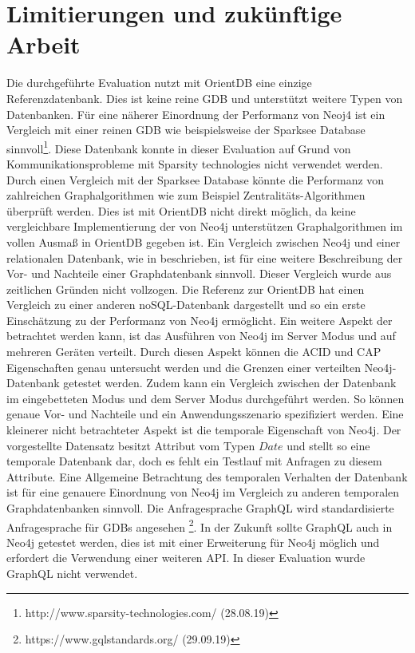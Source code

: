 \section{Limitierungen und zukünftige Arbeit}
Die durchgeführte Evaluation nutzt mit OrientDB  eine einzige Referenzdatenbank. Dies ist keine reine GDB und unterstützt weitere Typen von Datenbanken. Für eine näherer Einordnung der Performanz von Neoj4 ist ein Vergleich mit einer reinen GDB wie beispielsweise der Sparksee Database sinnvoll\footnote{http://www.sparsity-technologies.com/ (28.08.19)}. Diese Datenbank konnte in dieser Evaluation auf Grund von Kommunikationsprobleme mit Sparsity technologies nicht verwendet werden. Durch einen Vergleich mit der Sparksee Database könnte die Performanz von zahlreichen Graphalgorithmen   wie zum Beispiel Zentralitäts-Algorithmen überprüft werden. Dies ist mit OrientDB nicht direkt möglich, da keine vergleichbare Implementierung der von Neo4j unterstützen Graphalgorithmen im vollen Ausmaß in OrientDB gegeben ist. \newline 
Ein Vergleich zwischen Neo4j und einer relationalen Datenbank, wie in \parencite{vicknair2010comparison} beschrieben, ist für eine weitere Beschreibung der Vor- und Nachteile einer Graphdatenbank sinnvoll. Dieser Vergleich wurde aus zeitlichen Gründen nicht vollzogen. Die Referenz zur OrientDB hat einen Vergleich zu einer anderen noSQL-Datenbank dargestellt und so ein erste Einschätzung zu der Performanz von Neo4j ermöglicht. \newline
Ein weitere Aspekt der betrachtet werden kann, ist das Ausführen von Neo4j im Server Modus und auf mehreren Geräten verteilt. Durch diesen Aspekt können die ACID und CAP Eigenschaften genau untersucht werden und die Grenzen einer verteilten Neo4j-Datenbank getestet werden. Zudem kann ein Vergleich zwischen der Datenbank im eingebetteten Modus und dem Server Modus durchgeführt werden. So können genaue Vor- und Nachteile und ein Anwendungsszenario spezifiziert werden. \newline
Eine kleinerer nicht betrachteter Aspekt ist die temporale Eigenschaft von Neo4j. Der vorgestellte Datensatz besitzt Attribut vom Typen $Date$ und stellt so eine temporale Datenbank dar, doch es fehlt ein Testlauf mit Anfragen zu diesem Attribute. Eine Allgemeine Betrachtung des temporalen Verhalten der Datenbank ist für eine genauere Einordnung von Neo4j im Vergleich zu anderen temporalen Graphdatenbanken sinnvoll.   \newline
Die Anfragesprache GraphQL wird standardisierte Anfragesprache für GDBs angesehen \footnote{https://www.gqlstandards.org/ (29.09.19)}. In der Zukunft sollte GraphQL auch in Neo4j getestet werden, dies ist mit einer Erweiterung für Neo4j möglich und erfordert die Verwendung einer weiteren API. In dieser Evaluation wurde GraphQL nicht verwendet. 
